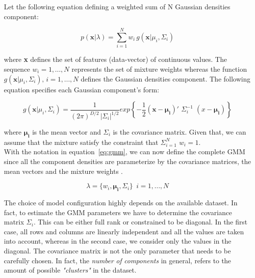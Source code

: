 \noindent Let the following equation defining a weighted sum of N Gaussian densities component:

\begin{equation}
	p(\textbf{x}|\lambda) = \sum_{i=1}^{N} w_{i} \, g(\textbf{x}|\mu_{i}, \Sigma_{i})
\end{equation}

\noindent where \textbf{x} defines the set of features (data-vector) of continuous values. The sequence $w_{i} = 1, ... , N$ represents the set of mixture weights whereas the function $g(\textbf{x}|\mu_{i}, \Sigma_{i}), \, i = 1, ... , N$ defines the Gaussian densities component. The following equation specifies each Gaussian component's form:

\begin{equation}
	g(\textbf{x}|\mu_{i}, \Sigma_{i}) = \frac{1}{(2\pi)^{D/2} \, |\Sigma_{i}|^{1/2}} exp \left \{ -\frac{1}{2} (\textbf{x} - \mathbf{\mu_{i}})' \,\, \Sigma_{i}^{-1} \,\, (x - \mathbf{\mu_{i}}) \right \}
\end{equation}

\noindent where $\mathbf{\mu_{i}}$ is the mean vector and $\Sigma_{i}$ is the covariance matrix. Given that, we can assume that the mixture satisfy the constraint that $\Sigma_{i=1}^{N} \,\, w_{i} = 1$. \\

\noindent With the notation in equation~\ref{eq:gmm}, we can now define the complete GMM since all the component densities are parameterize by the covariance matrices, the mean vectors and the mixture weights \cite{reynolds2000speaker}.

\begin{equation}
\label{eq:gmm}
	\lambda = \{ w_{i}, \mathbf{\mu_{i}}, \Sigma_{i}\} \,\,\, i = 1, ... , N
\end{equation}

\noindent The choice of model configuration highly depends on the available dataset. In fact, to estimate the GMM parameters we have to determine the covariance matrix $\Sigma_{i}$. This can be either full rank or constrained to be diagonal. In the first case, all rows and columns are linearly independent and all the values are taken into account, whereas in the second case, we consider only the values in the diagonal. The covariance matrix is not the only parameter that needs to be carefully chosen. In fact, the \textit{number of components} in general, refers to the amount of possible  \textit{"clusters"} in the dataset. \\


